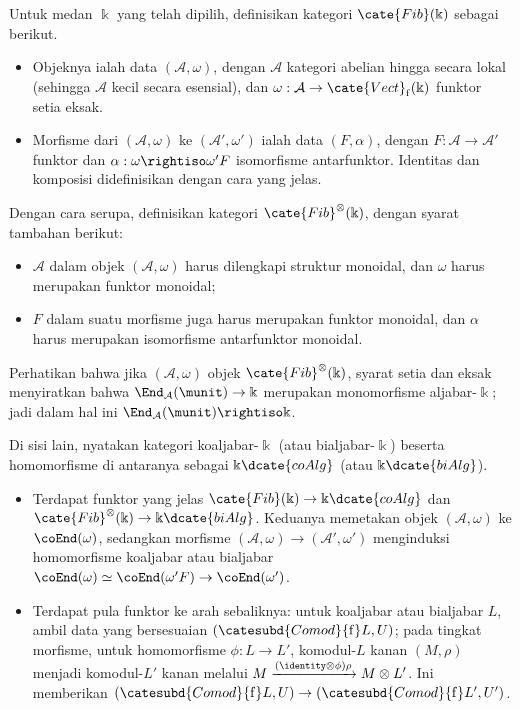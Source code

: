 \begin{definition}\label{def:Fib-cat}
	Untuk medan $\Bbbk$ yang telah dipilih, definisikan kategori
	$\cate{Fib}(\Bbbk)$ sebagai berikut.
	\begin{itemize}
		\item Objeknya ialah data $(\mathcal{A}, \omega)$, dengan
		$\mathcal{A}$ kategori abelian hingga secara lokal (sehingga $\mathcal{A}$ kecil
		secara esensial), dan
		$\omega: \mathcal{A} \to \cate{Vect}_{\mathrm{f}}(\Bbbk)$ funktor
		setia eksak.
		\item Morfisme dari $(\mathcal{A}, \omega)$ ke
		$(\mathcal{A}', \omega')$ ialah data $(F, \alpha)$, dengan
		$F: \mathcal{A} \to \mathcal{A}'$ funktor dan
		$\alpha: \omega \rightiso \omega' F$ isomorfisme antarfunktor.
		Identitas dan komposisi didefinisikan dengan cara yang jelas.
	\end{itemize}
	Dengan cara serupa, definisikan kategori
	$\cate{Fib}^{\otimes}(\Bbbk)$, dengan syarat tambahan berikut:
	\begin{itemize}
		\item $\mathcal{A}$ dalam objek $(\mathcal{A}, \omega)$ harus
		dilengkapi struktur monoidal, dan $\omega$ harus merupakan funktor
		monoidal;
		\item $F$ dalam suatu morfisme juga harus merupakan funktor monoidal,
		dan $\alpha$ harus merupakan isomorfisme antarfunktor monoidal.
	\end{itemize}
\end{definition}

Perhatikan bahwa jika $(\mathcal{A}, \omega)$ objek
$\cate{Fib}^{\otimes}(\Bbbk)$, syarat setia dan eksak menyiratkan bahwa
$\End_{\mathcal{A}}(\munit) \to \Bbbk$ merupakan monomorfisme
aljabar-$\Bbbk$; jadi dalam hal ini
$\End_{\mathcal{A}}(\munit) \rightiso \Bbbk$.

Di sisi lain, nyatakan kategori koaljabar-$\Bbbk$ (atau bialjabar-$\Bbbk$)
beserta homomorfisme di antaranya sebagai $\Bbbk\dcate{coAlg}$ (atau
$\Bbbk\dcate{biAlg}$).
\begin{itemize}
	\item Terdapat funktor yang jelas
	$\cate{Fib}(\Bbbk) \to \Bbbk\dcate{coAlg}$ dan
	$\cate{Fib}^{\otimes}(\Bbbk) \to \Bbbk\dcate{biAlg}$. Keduanya
	memetakan objek $(\mathcal{A}, \omega)$ ke $\coEnd(\omega)$, sedangkan
	morfisme $(\mathcal{A}, \omega) \to (\mathcal{A}', \omega')$
	menginduksi homomorfisme koaljabar atau bialjabar
	$\coEnd(\omega) \simeq \coEnd(\omega' F) \to \coEnd(\omega')$.
	\item Terdapat pula funktor ke arah sebaliknya: untuk koaljabar atau
	bialjabar $L$, ambil data yang bersesuaian
	$\left(\catesubd{Comod}{\mathrm{f}}L, U \right)$; pada tingkat morfisme,
	untuk homomorfisme $\phi: L \to L'$, komodul-$L$ kanan $(M, \rho)$
	menjadi komodul-$L'$ kanan melalui
	$M \xrightarrow{(\identity \otimes \phi) \rho} M \otimes L'$.
	Ini memberikan
	$\left(\catesubd{Comod}{\mathrm{f}}L, U \right) \to \left(\catesubd{Comod}{\mathrm{f}}L', U' \right)$.
\end{itemize}

